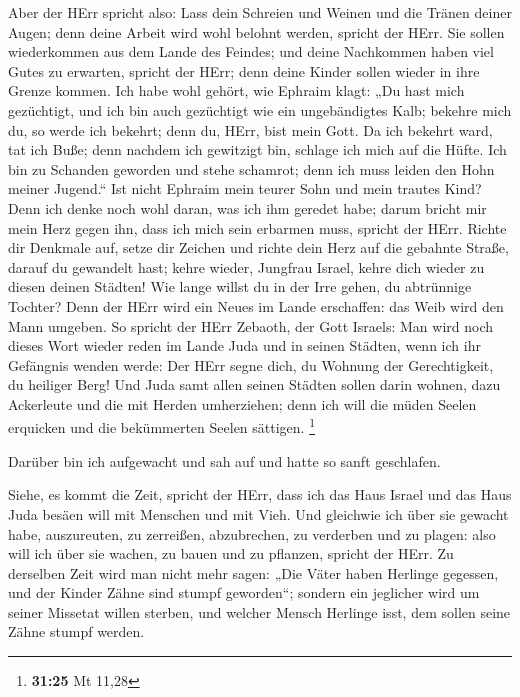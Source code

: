  Aber der HErr spricht also: Lass dein Schreien und Weinen
und die Tränen deiner Augen; denn deine Arbeit wird wohl belohnt werden,
spricht der HErr. Sie sollen wiederkommen aus dem Lande des Feindes;
 und deine Nachkommen haben viel Gutes zu erwarten, spricht
der HErr; denn deine Kinder sollen wieder in ihre Grenze kommen.
 Ich habe wohl gehört, wie Ephraim klagt: „Du hast mich
gezüchtigt, und ich bin auch gezüchtigt wie ein ungebändigtes Kalb;
bekehre mich du, so werde ich bekehrt; denn du, HErr, bist mein Gott.
 Da ich bekehrt ward, tat ich Buße; denn nachdem ich
gewitzigt bin, schlage ich mich auf die Hüfte. Ich bin zu Schanden
geworden und stehe schamrot; denn ich muss leiden den Hohn meiner
Jugend.``  Ist nicht Ephraim mein teurer Sohn und mein
trautes Kind? Denn ich denke noch wohl daran, was ich ihm geredet habe;
darum bricht mir mein Herz gegen ihn, dass ich mich sein erbarmen muss,
spricht der HErr.  Richte dir Denkmale auf, setze dir
Zeichen und richte dein Herz auf die gebahnte Straße, darauf du
gewandelt hast; kehre wieder, Jungfrau Israel, kehre dich wieder zu
diesen deinen Städten!  Wie lange willst du in der Irre
gehen, du abtrünnige Tochter? Denn der HErr wird ein Neues im Lande
erschaffen: das Weib wird den Mann umgeben.  So spricht der
HErr Zebaoth, der Gott Israels: Man wird noch dieses Wort wieder reden
im Lande Juda und in seinen Städten, wenn ich ihr Gefängnis wenden
werde: Der HErr segne dich, du Wohnung der Gerechtigkeit, du heiliger
Berg!  Und Juda samt allen seinen Städten sollen darin
wohnen, dazu Ackerleute und die mit Herden umherziehen; 
denn ich will die müden Seelen erquicken und die bekümmerten Seelen
sättigen. \footnote{\textbf{31:25} Mt 11,28}

 Darüber bin ich aufgewacht und sah auf und hatte so sanft
geschlafen.

 Siehe, es kommt die Zeit, spricht der HErr, dass ich das
Haus Israel und das Haus Juda besäen will mit Menschen und mit Vieh.
 Und gleichwie ich über sie gewacht habe, auszureuten, zu
zerreißen, abzubrechen, zu verderben und zu plagen: also will ich über
sie wachen, zu bauen und zu pflanzen, spricht der HErr.  Zu
derselben Zeit wird man nicht mehr sagen: „Die Väter haben Herlinge
gegessen, und der Kinder Zähne sind stumpf geworden``; 
sondern ein jeglicher wird um seiner Missetat willen sterben, und
welcher Mensch Herlinge isst, dem sollen seine Zähne stumpf werden.

